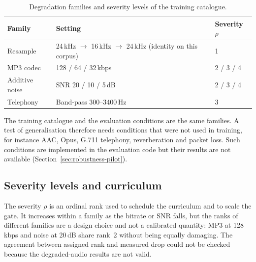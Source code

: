 \begin{table}[htbp]
\centering
\caption{Degradation families and severity levels of the training catalogue.}
\label{tab:degradations}
\small
\begin{tabular}{@{}lll@{}}
\toprule
Family & Setting & Severity $\rho$ \\
\midrule
Resample & 24\,kHz $\rightarrow$ 16\,kHz $\rightarrow$ 24\,kHz (identity on this corpus) & 1 \\
MP3 codec & 128 / 64 / 32\,kbps & 2 / 3 / 4 \\
Additive noise & SNR 20 / 10 / 5\,dB & 2 / 3 / 4 \\
Telephony & Band-pass 300--3400\,Hz & 3 \\
\bottomrule
\end{tabular}
\end{table}

The training catalogue and the evaluation conditions are the same families. A test of generalisation therefore needs conditions that were not used in training, for instance AAC, Opus, G.711 telephony, reverberation and packet loss. Such conditions are implemented in the evaluation code but their results are not available (Section~\ref{sec:robustness-pilot}).


\subsection{Severity levels and curriculum}

The severity $\rho$ is an ordinal rank used to schedule the curriculum and to scale the gate. It increases within a family as the bitrate or SNR falls, but the ranks of different families are a design choice and not a calibrated quantity: MP3 at 128\,kbps and noise at 20\,dB share rank~2 without being equally damaging. The agreement between assigned rank and measured drop could not be checked because the degraded-audio results are not valid.

